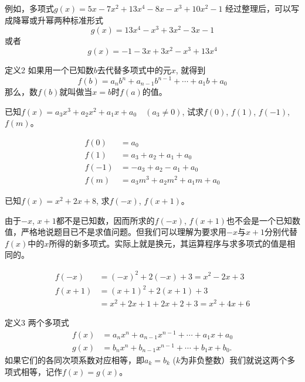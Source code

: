 例如，多项式$g (x) =5x-7x^2+13x^4-8x-x^3+10x^2-1$
经过整理后，可以写成降幂或升幂两种标准形式
\[g (x) =13x^4-x^3+3x^2-3x-1\]
或者
\[g (x) =-1-3x+3x^2-x^3+13x^4\]

\begin{blk}{定义2}
如果用一个已知数$b$去代替多项式中的元$x$, 就得到 
\[f(b)=a_nb^n+a_{n-1}b^{n-1}+\cdots+a_1b +a_0\]
那么，数$f(b)$就叫做当$x=b$时$f(a)$的值。
\end{blk}

\begin{example}
    已知$f(x)=a_3x^3+a_2x^2+a_1x+a_0\quad (a_3\ne 0)$, 试求$f (0)$, $f (1)$, $f (-1)$, $f (m)$。 
\end{example}


\begin{solution}
\[\begin{split}
    f (0) &=a_0\\
    f (1) &=a_3+a_2+a_1+a_0\\
    f (-1) &= -a_3+a_2-a_1+a_0\\
    f (m) &=a_3m^3+a_2m^2+a_1m+a_0
\end{split}\]
\end{solution}

\begin{example}
    已知$f(x)=x^2+2x+8$, 求$f(-x)$, $f(x+1)$。
\end{example}

\begin{analyze}
    由于$-x$, $x+1$都不是已知数，因而所求的$f(-x)$, $f(x+1)$也不会是一个已知数值，严格地说题目已不是求值问题。但我们可以理解为要求用$-x$与$x+1$分别代替$f(x)$中的$x$所得的新多项式。实际上就是换元，其运算程序与求多项式的值是相同的。
\end{analyze}

\begin{solution}
\[\begin{split}
    f(-x)&=(-x)^2+2(-x)+3=x^2-2x+3\\    
    f(x+1)&=(x+1)^2+2(x+1)+3\\
    &=x^2+2x+1+2x+2+3=x^2+4x+6
\end{split}\] 
\end{solution}

\begin{blk}{定义3}
    两个多项式
\[\begin{split}
f (x) &=a_nx^n+a_{n-1}x^{n-1}+\cdots +a_1x+a_0\\
g (x) &=b_nx^n+b_{n-1}x^{n-1}+\cdots+b_1x+b_0.    
\end{split}\]
如果它们的各同次项系数对应相等，即$a_k=b_k$ ($k$为非负整数）我们就说这两个多项式相等，记作$f(x)=g(x)$。
\end{blk}


